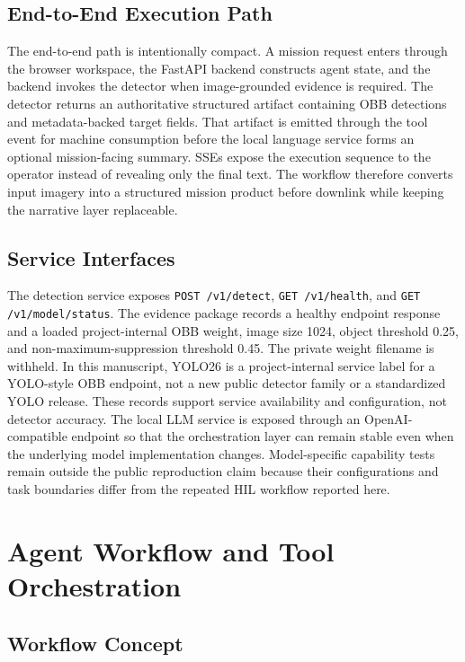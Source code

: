 \documentclass[10pt,letterpaper]{article}
\begin{document}
\subsection{End-to-End Execution Path}

The end-to-end path is intentionally compact. A mission request enters through the browser workspace, the FastAPI backend constructs agent state, and the backend invokes the detector when image-grounded evidence is required. The detector returns an authoritative structured artifact containing OBB detections and metadata-backed target fields. That artifact is emitted through the tool event for machine consumption before the local language service forms an optional mission-facing summary. SSEs expose the execution sequence to the operator instead of revealing only the final text. The workflow therefore converts input imagery into a structured mission product before downlink while keeping the narrative layer replaceable.

\subsection{Service Interfaces}

The detection service exposes \texttt{POST /v1/detect}, \texttt{GET /v1/health}, and \texttt{GET /v1/model/status}. The evidence package records a healthy endpoint response and a loaded project-internal OBB weight, image size 1024, object threshold 0.25, and non-maximum-suppression threshold 0.45. The private weight filename is withheld. In this manuscript, YOLO26 is a project-internal service label for a YOLO-style OBB endpoint, not a new public detector family or a standardized YOLO release. These records support service availability and configuration, not detector accuracy. The local LLM service is exposed through an OpenAI-compatible endpoint so that the orchestration layer can remain stable even when the underlying model implementation changes. Model-specific capability tests remain outside the public reproduction claim because their configurations and task boundaries differ from the repeated HIL workflow reported here.

\section{Agent Workflow and Tool Orchestration}
\label{sec:workflow}

\subsection{Workflow Concept}
\end{document}

